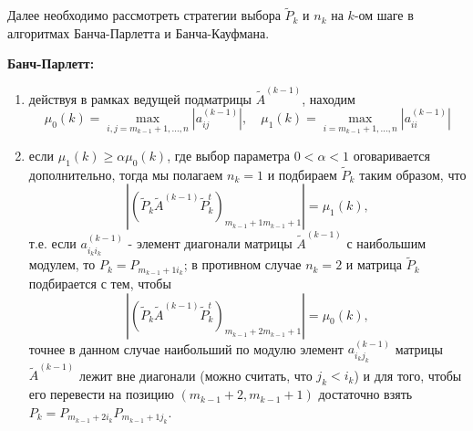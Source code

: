 \documentclass[a4paper, 12pt]{article}   	%
\begin{document}
Далее необходимо рассмотреть стратегии выбора $\widetilde{P}_k$ и $n_k$ на $k$-ом шаге в алгоритмах Банча-Парлетта и Банча-Кауфмана.

\textbf{Банч-Парлетт:}
\begin{enumerate}
    \item действуя в рамках ведущей подматрицы $\widetilde{A}^{(k-1)}$, находим 
    \begin{equation*}\label{part5}
        \mu_0(k) = \max_{i,j = m_{k-1} + 1,..., n} | a_{ij}^{(k-1)}|, \quad \mu_1(k)= \max_{i = m_{k-1} + 1,..., n} | a_{ii}^{(k-1)}|
    \end{equation*}

    \item если $\mu_1(k) \geq \alpha \mu_0(k)$, где выбор параметра $0 < \alpha < 1$ оговаривается дополнительно, тогда мы полагаем $n_k=1$ и подбираем $\widetilde{P}_k$ таким образом, что
    \begin{equation*}\label{part6}
        |(\widetilde{P}_k \widetilde{A}^{(k-1)} \widetilde{P}_k^t)_{m_{k-1}+1 m_{k-1}+1}| = \mu_1(k),
    \end{equation*}
    т.е. если $a_{i_k i_k}^{(k-1)}$ - элемент диагонали матрицы $\widetilde{A}^{(k-1)}$ с наибольшим модулем, то $P_k = P_{m_{k-1}+1i_k}$; в противном случае $n_k = 2$ и матрица $\widetilde{P}_k$ подбирается с тем, чтобы
    \begin{equation*}\label{part7}
        |(\widetilde{P}_k \widetilde{A}^{(k-1)} \widetilde{P}_k^t)_{m_{k-1}+2 m_{k-1}+1}| = \mu_0(k),
    \end{equation*}
    точнее в данном случае наибольший по модулю элемент $a_{i_k j_k}^{(k-1)}$ матрицы $\widetilde{A}^{(k-1)}$ лежит вне диагонали (можно считать, что $j_k < i_k$) и для того, чтобы его перевести на позицию $(m_{k-1} + 2, m_{k-1} + 1)$ достаточно взять $P_k = P_{m_{k-1}+2i_k} P_{m_{k-1}+1j_k}$.
\end{enumerate} 
\end{document}
